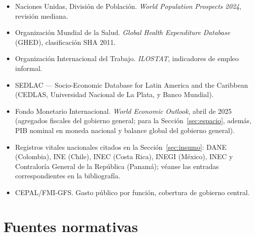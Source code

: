\documentclass[12pt, letterpaper]{article}
\begin{document}
\begin{itemize}
  \item Naciones Unidas, División de Población. \textit{World Population
        Prospects 2024}, revisión mediana.
  \item Organización Mundial de la Salud. \textit{Global Health Expenditure
        Database} (GHED), clasificación SHA 2011.
  \item Organización Internacional del Trabajo. \textit{ILOSTAT}, indicadores de
        empleo informal.
  \item SEDLAC --- Socio-Economic Database for Latin America and the Caribbean
        (CEDLAS, Universidad Nacional de La Plata, y Banco Mundial).
  \item Fondo Monetario Internacional. \textit{World Economic Outlook}, abril de
        2025 (agregados fiscales del gobierno general; para la
        Sección~\ref{sec:espacio}, además, PIB nominal en moneda nacional y balance
        global del gobierno general).
  \item Registros vitales nacionales citados en la Sección~\ref{sec:insumo}:
        DANE (Colombia), INE (Chile), INEC (Costa Rica), INEGI (México), INEC y
        Contraloría General de la República (Panamá); véanse las entradas
        correspondientes en la bibliografía.
  \item CEPAL/FMI-GFS. Gasto público por función, cobertura de gobierno central.
\end{itemize}

\section*{Fuentes normativas}
\end{document}
